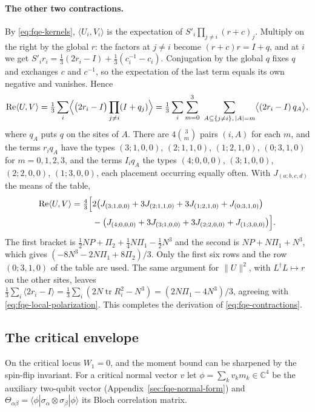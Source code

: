 \paragraph{The other two contractions.} By \eqref{eq:fqe-kernels},
\(\langle U_i,V_i\rangle\) is the expectation of \(S'_i\prod_{j\ne i}(r+c)_j\). Multiply on the right by the global \(r\):
the factors at \(j\ne i\) become \((r+c)r=I+q\), and at \(i\) we get
\(S'_ir_i=\frac13(2r_i-I)+\frac13(c_i^{-1}-c_i)\). Conjugation by the global \(q\) fixes \(q\) and exchanges
\(c\) and \(c^{-1}\), so the expectation of the last term equals its own negative and vanishes. Hence \[
\operatorname{Re}\langle U,V\rangle=\tfrac13\sum_i\Bigl\langle\bigl(2r_i-I\bigr)\prod_{j\ne i}(I+q_j)\Bigr\rangle
=\tfrac13\sum_i\sum_{m=0}^3\ \sum_{A\subseteq\{j\ne i\},\,|A|=m}\bigl\langle(2r_i-I)\,q_A\bigr\rangle ,
\] where \(q_A\) puts \(q\) on the sites of \(A\). There are \(4\binom3m\) pairs \((i,A)\) for each \(m\), and the terms
\(r_iq_A\) have the types \((3;1,0,0)\), \((2;1,1,0)\), \((1;2,1,0)\), \((0;3,1,0)\) for \(m=0,1,2,3\),
and the terms \(I_iq_A\) the types \((4;0,0,0)\), \((3;1,0,0)\), \((2;2,0,0)\), \((1;3,0,0)\), each placement occurring equally often. With
\(J_{(a;b,c,d)}\) the means of the table, \[
\begin{aligned}
\operatorname{Re}\langle U,V\rangle=\tfrac43\Bigl[&2\bigl(J_{(3;1,0,0)}+3J_{(2;1,1,0)}+3J_{(1;2,1,0)}+J_{(0;3,1,0)}\bigr)\\
&-\bigl(J_{(4;0,0,0)}+3J_{(3;1,0,0)}+3J_{(2;2,0,0)}+J_{(1;3,0,0)}\bigr)\Bigr].
\end{aligned}
\] The first bracket is \(\frac12NP+\Pi_2+\frac14N\Pi_1-\frac12N^3\) and the second is \(NP+N\Pi_1+N^3\), which gives
\((-8N^3-2N\Pi_1+8\Pi_2)/3\). Only the first six rows and the row \((0;3,1,0)\) of the table are used.
The same argument for \(\|U\|^2\), with \(L^\dagger L\mapsto r\) on the other sites, leaves
\(\frac13\sum_i\langle 2r_i-I\rangle=\frac13\sum_i(2N\operatorname{tr}R_i^2-N^3)=(2N\Pi_1-4N^3)/3\), agreeing with \eqref{eq:fqe-local-polarization}.
This completes the derivation of \eqref{eq:fqe-contractions}.

\subsection{The critical envelope}\label{sec:fqe-critical-envelope}

On the critical locus $W_1=0$, and the moment bound can be sharpened by the spin-flip invariant. For a critical
normal vector $v$ let $\phi=\sum_kv_km_k\in\mathbb C^4$ be the auxiliary two-qubit vector (Appendix~\ref{sec:fqe-normal-form})
and $\Theta_{\alpha\beta}=\langle\phi|\sigma_\alpha\otimes\sigma_\beta|\phi\rangle$ its Bloch correlation matrix.


